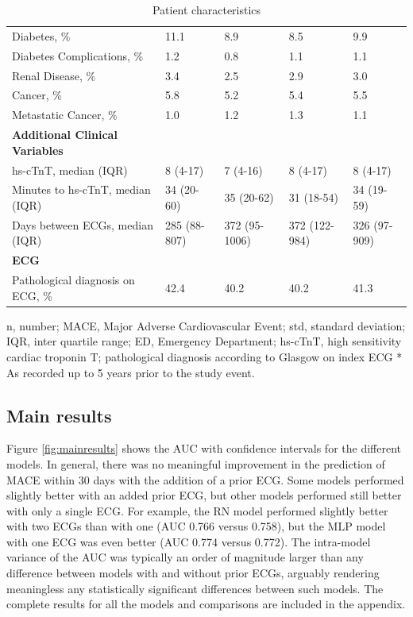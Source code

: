 \documentclass[preprint]{elsarticle}
\begin{document}
\begin{table}[]
\begin{tabular}{@{}lllll@{}}
Diabetes, \%                                     & 11.1           & 8.9                 & 8.5           & 9.9            \\
Diabetes Complications, \%                       & 1.2            & 0.8                 & 1.1           & 1.1            \\
Renal Disease, \%                                & 3.4            & 2.5                 & 2.9           & 3.0            \\
Cancer, \%                                       & 5.8            & 5.2                 & 5.4           & 5.5            \\
Metastatic Cancer, \%                            & 1.0            & 1.2                 & 1.3           & 1.1            \\
\textbf{Additional Clinical Variables}           &                &                     &               &                \\
hs-cTnT, median (IQR)                            & 8 (4-17)       & 7 (4-16)            & 8 (4-17)      & 8 (4-17)       \\
Minutes to hs-cTnT, median (IQR) & 34 (20-60)     & 35 (20-62)          & 31 (18-54)    & 34 (19-59)     \\
Days between ECGs, median (IQR)                  & 285 (88-807)   & 372 (95-1006)       & 372 (122-984) & 326 (97-909)   \\
\textbf{ECG}                                     &                &                     &               &                \\
Pathological diagnosis on ECG, \%                & 42.4           & 40.2                & 40.2          & 41.3          
\end{tabular}
\caption{Patient characteristics}
\medskip
\small
n, number; MACE, Major Adverse Cardiovascular Event; std, standard deviation; IQR, inter quartile range; ED, Emergency Department; hs-cTnT, high sensitivity cardiac troponin T; pathological diagnosis according to Glasgow on index ECG
* As recorded up to 5 years prior to the study event.
\label{table:characteristics}
\end{table}

\subsection{Main results}
Figure \ref{fig:mainresults} shows the AUC with confidence intervals for the different models. In general, there was no meaningful improvement in the prediction of MACE within 30 days with the addition of a prior ECG. Some models performed slightly better with an added prior ECG, but other models performed still better with only a single ECG. For example, the RN model performed slightly better with two ECGs than with one (AUC 0.766 versus 0.758), but the MLP model with one ECG was even better (AUC 0.774 versus 0.772). The intra-model variance of the AUC was typically an order of magnitude larger than any difference between models with and without prior ECGs, arguably rendering meaningless any statistically significant differences between such models. The complete results for all the models and comparisons are included in the appendix. 
\end{document}
